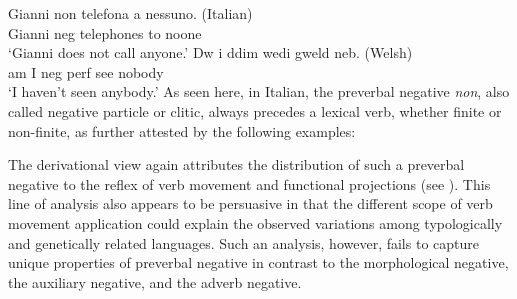 \documentclass[output=paper
                ,modfonts
                		,nonflat
	        ,collection
	        ,collectionchapter
	        ,collectiontoclongg
 	        ,biblatex
                ,babelshorthands
                ,newtxmath
                ,draftmode
                ,colorlinks, citecolor=brown
]{./langsci/langscibook}
\begin{document}
{\eal
\ex \label{position-1a}
\gll Gianni non telefona a nessuno. \hfill (Italian) \\
     Gianni {\sc neg} telephones to noone\\
\glt`Gianni does not call anyone.'
\ex \label{position-1c}
\gll Dw i ddim wedi gweld neb. \hfill  (Welsh) \\
     am I {\sc neg} {\sc perf} see nobody\\
\glt `I haven't seen anybody.'
\zl
%
%
As seen here, in Italian,
the preverbal negative \textit{non}, also called negative particle or
clitic, always precedes a lexical  verb, whether finite or
non-finite, as further attested by the following
examples:

\eal
\zl

The derivational view again attributes the distribution of such
a preverbal negative to the reflex of verb movement and functional
projections (see \citealt{Belletti:90, Zanuttini:91}). This line of analysis also appears to be persuasive
in that the different scope of verb movement application could explain
the observed variations among typologically and genetically related
languages. Such an analysis, however,
  fails to capture unique properties of preverbal negative
  in contrast to the morphological negative, the auxiliary negative, and the adverb negative.

}
\end{document}

